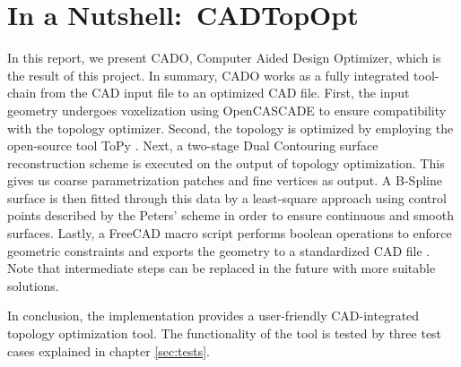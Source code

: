 \section{In a Nutshell:\ \acl{CADTopOpt}}
\label{sec:nutshell}
In this report, we present CADO, Computer Aided Design Optimizer, which is the result of this project. In summary, CADO works as a fully integrated tool-chain from the CAD input file to an optimized CAD file. First, the input geometry undergoes voxelization using OpenCASCADE to ensure compatibility with the topology optimizer. Second, the topology is optimized by employing the open-source tool ToPy \cite{ToPy}.  
Next, a two-stage Dual Contouring surface reconstruction scheme is executed on the output of topology optimization. This gives us coarse parametrization patches and fine vertices as output.
A B-Spline surface is then fitted through this data by a least-square approach using control points described by the Peters' scheme \cite{peters1992constructing} in order to ensure continuous and smooth surfaces. Lastly, a FreeCAD macro script performs boolean operations to enforce geometric constraints and exports the geometry to a standardized CAD file \cite{FreeCAD}.
Note that intermediate steps can be replaced in the future with more suitable solutions. 

In conclusion, the implementation provides a user-friendly CAD-integrated topology optimization tool. The functionality of the tool is tested by three test cases explained in chapter \ref{sec:tests}.

